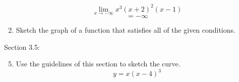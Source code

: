 \documentclass[12pt]{article}
\begin{document}
\begin{enumerate}
    ~\\~
    \[\lim_{x\to -\infty}x^3(x + 2)^2(x-1)\]
    \[\boxed{= -\infty}\]
    \begin{figure}[!h]      
        \begin{framed}
            \centering  
        \end{framed}
        \end{figure}
    \setcounter{enumi}{58}
    \item Sketch the graph of a function that satisfies all of the given conditions.
\end{enumerate}
\newpage
Section 3.5:
\begin{enumerate}
\setcounter{enumi}{4}
    \item Use the guidelines of this section to sketch the curve.
    \[y = x(x-4)^3\]
\end{enumerate}
\end{document}
